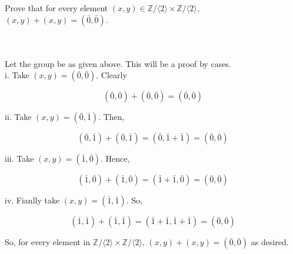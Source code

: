 Prove that for every element $(x,y)\in\mathbb{Z}/\langle2\rangle\times\mathbb{Z}/\langle2\rangle$,
$(x,y)+(x,y)=(\bar{0},\bar{0})$.\\\\

\begin{solution}\renewcommand{\qedsymbol}{}\ \\
    Let the group be as given above. This will be a proof by cases.\\

    i. Take $(x,y)=(\bar{0},\bar{0})$. Clearly
    
    $$(\bar{0},\bar{0})+(\bar{0},\bar{0})=(\bar{0},\bar{0})$$

    ii. Take $(x,y)=(\bar{0},\bar{1})$. Then,
    
    $$(\bar{0},\bar{1})+(\bar{0},\bar{1})=(\bar{0},\bar{1}+\bar{1})=(\bar{0},\bar{0})$$

    iii. Take $(x,y)=(\bar{1},\bar{0})$. Hence,
    
    $$(\bar{1},\bar{0})+(\bar{1},\bar{0})=(\bar{1}+\bar{1},\bar{0})=(\bar{0},\bar{0})$$

    iv. Fianlly take $(x,y)=(\bar{1},\bar{1})$. So,
    
    $$(\bar{1},\bar{1})+(\bar{1},\bar{1})=(\bar{1}+\bar{1},\bar{1}+\bar{1})=(\bar{0},\bar{0})$$
    
    So, for every element in $\mathbb{Z}/\langle2\rangle\times\mathbb{Z}/\langle2\rangle$,
    $(x,y)+(x,y)=(\bar{0},\bar{0})$ as desired.

\end{solution}
